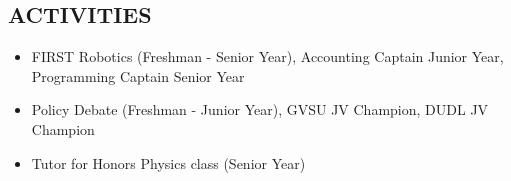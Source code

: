 \documentclass[margin, line]{res}
\begin{document}
\begin{resume}
\section{ACTIVITIES}
\begin{itemize}
  \item FIRST Robotics (Freshman - Senior Year), Accounting Captain Junior Year, Programming Captain Senior Year
  \item Policy Debate (Freshman - Junior Year), GVSU JV Champion, DUDL JV Champion
  \item Tutor for Honors Physics class (Senior Year)
\end{itemize}
\end{resume}
\end{document}
